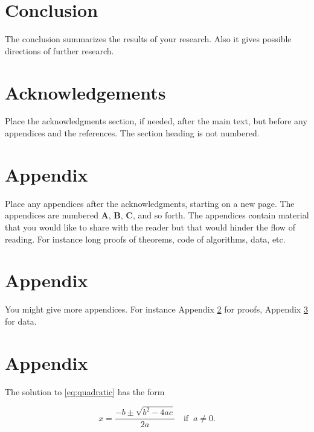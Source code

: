 \documentclass[a4paper,11pt]{article}
\theoremstyle{plain}
\theoremstyle{definition}
\begin{document}
\section{Conclusion}\label{s:con}
The conclusion summarizes the results of your research.
Also it gives possible directions of further research.

\section*{Acknowledgements}
Place the acknowledgments section, if needed, after the main text, 
but before any appendices and the references. The section heading is not numbered.

\newpage
\appendix

\section{Appendix}\label{s:app1}
Place any appendices after the acknowledgments, starting on a new page.
The appendices are numbered
\textbf{A}, \textbf{B}, \textbf{C}, and so forth.
The appendices contain material that you would like to share with the
reader but that would hinder the flow of reading. For instance long
proofs of theorems, code of algorithms, data, etc.

\section{Appendix}\label{s:app2}
You might give more appendices. For instance Appendix \ref{s:app1} for
proofs, Appendix \ref{s:app2} for data.

\section{Appendix}\label{app:quadratic}
The solution to \eqref{eq:quadratic} has the form

\begin{equation} \label{eq:quadraticsol}
x = \frac{-b \pm \sqrt{b^2-4ac}}{2a} \quad\text{if}\;\; a \ne 0.
\end{equation}



\end{document}
